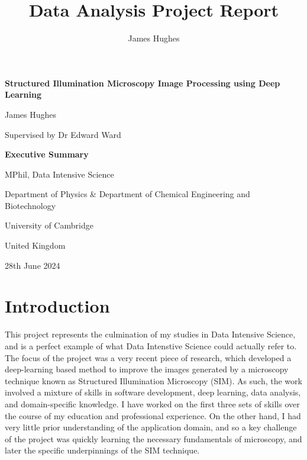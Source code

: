 \documentclass[12pt]{article}
\title{Data Analysis Project Report}
\author{James Hughes}
\begin{document}
\begin{titlepage}
    \begin{center}
        \vspace*{1cm}

        \Huge
        \textbf{Structured Illumination Microscopy Image Processing using Deep Learning}

        \vspace{0.5cm}
        \LARGE

        James Hughes

        Supervised by Dr Edward Ward

        \vspace{2cm}
        \Huge
        \textbf{Executive Summary}

        \vfill

        MPhil, Data Intensive Science

        \vspace{0.8cm}

        \Large
        Department of Physics \& Department of Chemical Engineering and Biotechnology

        University of Cambridge

        United Kingdom

        28th June 2024

    \end{center}
\end{titlepage}

\newpage

\newpage
\section{Introduction}

This project represents the culmination of my studies in Data Intensive Science,
and is a perfect example of what Data Intenstive Science could actually refer to.
The focus of the project was a very recent piece of research,
which developed a deep-learning based method to improve the images generated by a microscopy technique known as Structured Illumination Microscopy (SIM).
As such, the work involved a mixture of skills in software development, deep learning, data analysis, and domain-specific knowledge.
I have worked on the first three sets of skills over the course of my education and professional experience.
On the other hand, I had very little prior understanding of the application domain,
and so a key challenge of the project was quickly learning the necessary fundamentals of microscopy,
and later the specific underpinnings of the SIM technique.
\end{document}
